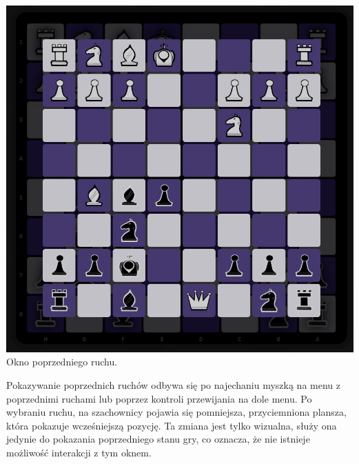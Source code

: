 \documentclass[12pt,a4paper]{article}
\begin{document}
\begin{minipage}[t]{0.35\textwidth} 
    \vspace{0pt} 
    \centering 
    \includegraphics[width=\linewidth]{images/ins_min_prev.png} 
    Okno poprzedniego ruchu.
\end{minipage} 
\hfill 
\begin{minipage}[t]{0.55\textwidth} 
    \vspace{0pt}
    \raggedright 
    Pokazywanie poprzednich ruchów odbywa się po najechaniu myszką na menu z poprzednimi ruchami lub poprzez kontroli przewijania na dole menu. Po wybraniu ruchu, na szachownicy pojawia się pomniejsza, przyciemniona plansza, która pokazuje wcześniejszą pozycję. Ta zmiana jest tylko wizualna, służy ona jedynie do pokazania poprzedniego stanu gry, co oznacza, że nie istnieje możliwość interakcji z tym oknem.
\end{minipage}

\vspace{1cm}
\end{document}

